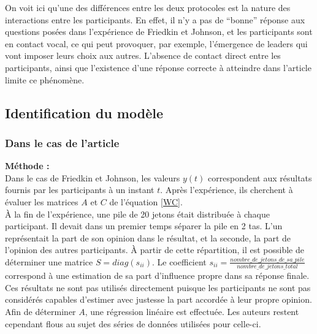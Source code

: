 \documentclass{scrreprt}
\begin{document}
\begin{multicols}{2}

On voit ici qu'une des différences entre les deux protocoles est la nature des interactions entre les participants. En effet, il n’y a pas de “bonne” réponse aux questions posées dans l'expérience de Friedkin et Johnson, et les participants sont en contact vocal, ce qui peut provoquer, par exemple, l’émergence de leaders qui vont imposer leurs choix aux autres. L’absence de contact direct entre les participants, ainsi que l’existence d’une réponse correcte à atteindre dans l'article \cite{VMG} limite ce phénomène.\\

\subsection{Identification du modèle}

\subsubsection{Dans le cas de l'article \cite{FJ}}

\textbf{Méthode :} \\

Dans le cas de Friedkin et Johnson, les valeurs $y(t)$ correspondent aux résultats fournis par les participants à un instant $t$. Après l'expérience, ils cherchent à évaluer les matrices $A$ et $C$ de l'équation \eqref{WC}. \\ %



À la fin de l'expérience, une pile de 20 jetons était distribuée à chaque participant. Il devait dans un premier temps séparer la pile en 2 tas. L'un représentait la part de son opinion dans le résultat, et la seconde, la part de l'opinion des autres participants. À partir de cette répartition, il est possible de déterminer une matrice $S = diag(s_{ii})$. Le coefficient $s_{ii} = \frac{nombre\_de\_jetons\_de\_sa\_pile}{nombre\_de\_jetons\_total}$ correspond à une estimation de sa part d'influence propre dans sa réponse finale. Ces résultats ne sont pas utilisés directement puisque les participants ne sont pas considérés capables d'estimer avec justesse la part accordée à leur propre opinion. Afin de déterminer $A$, une régression linéaire est effectuée. Les auteurs restent cependant flous au sujet des séries de données utilisées pour celle-ci.\\


\end{multicols}
\end{document}
